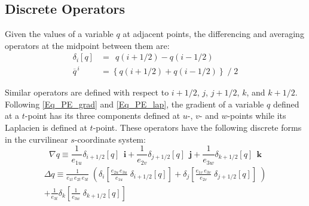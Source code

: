 \subsection{Discrete Operators}
\label{DOM_operators}

Given the values of a variable $q$ at adjacent points, the differencing and 
averaging operators at the midpoint between them are:
\begin{subequations} \label{Eq_di_mi}
\begin{align}
 \delta _i [q]       &=  \  \    q(i+1/2)  - q(i-1/2)		\\
 \overline q^{\,i} &= \left\{ q(i+1/2) + q(i-1/2) \right\} \; / \; 2
\end{align}
\end{subequations}

Similar operators are defined with respect to $i+1/2$, $j$, $j+1/2$, $k$, and 
$k+1/2$. Following \eqref{Eq_PE_grad} and \eqref{Eq_PE_lap}, the gradient of a 
variable $q$ defined at a $t$-point has its three components defined at $u$-, $v$- 
and $w$-points while its Laplacien is defined at $t$-point. These operators have 
the following discrete forms in the curvilinear $s$-coordinate system:
\begin{equation} \label{Eq_DOM_grad}
\nabla q\equiv 	\frac{1}{e_{1u} } \delta _{i+1/2 } [q] \;\,\mathbf{i}
		+	\frac{1}{e_{2v} } \delta _{j+1/2 } [q] \;\,\mathbf{j}
		+	\frac{1}{e_{3w}} \delta _{k+1/2} [q] \;\,\mathbf{k}
\end{equation}
\begin{multline} \label{Eq_DOM_lap}
\Delta q\equiv \frac{1}{e_{1t}\,e_{2t}\,e_{3t} }
       \;\left(          \delta_i  \left[ \frac{e_{2u}\,e_{3u}} {e_{1u}} \;\delta_{i+1/2} [q] \right]
+                        \delta_j  \left[ \frac{e_{1v}\,e_{3v}}  {e_{2v}} \;\delta_{j+1/2} [q] \right] \;  \right)		\\
+\frac{1}{e_{3t}} \delta_k \left[ \frac{1}{e_{3w} }                     \;\delta_{k+1/2} [q] \right]
\end{multline}

